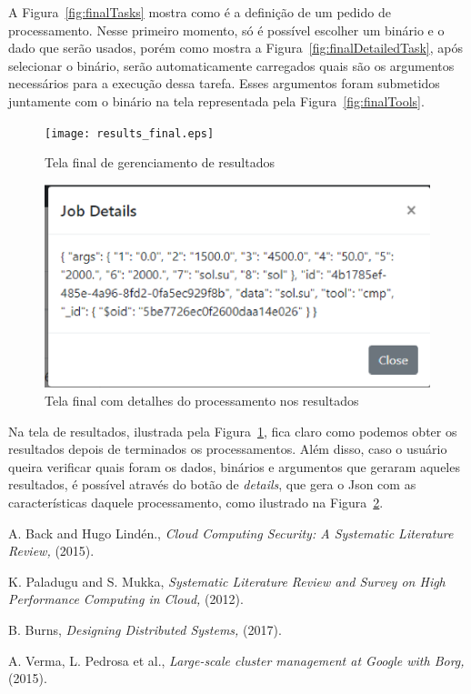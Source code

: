 \documentclass[11pt,twoside]{article}
\begin{document}
A Figura~\ref{fig:finalTasks} mostra como é a definição de um pedido de processamento. Nesse primeiro momento, só é possível escolher um binário e o dado que serão usados, porém como mostra 
a Figura~\ref{fig:finalDetailedTask}, após selecionar o binário, serão automaticamente carregados quais são os argumentos necessários para a execução dessa tarefa. Esses argumentos
foram submetidos juntamente com o binário na tela representada pela Figura~\ref{fig:finalTools}.

\begin{figure}[!h]
  \centering
  \texttt{[image: results\_final.eps]}
  \caption{Tela final de gerenciamento de resultados}
  \label{fig:finalResults}
\end{figure}

\begin{figure}[!h]
  \centering
  \includegraphics[scale=0.6]{results_detail_final.eps}
  \caption{Tela final com detalhes do processamento nos resultados}
  \label{fig:finalResultsDetail}
\end{figure}

Na tela de resultados, ilustrada pela Figura~\ref{fig:finalResults}, fica claro como podemos obter os resultados depois de terminados os processamentos. Além disso, caso o usuário queira verificar 
quais foram os dados, binários e argumentos que geraram aqueles resultados, é possível através do botão de \emph{details}, que gera o Json com as características daquele processamento, como ilustrado na 
Figura~\ref{fig:finalResultsDetail}.

\begin{thebibliography}{99}

 A. Back and Hugo Lindén., {\it Cloud Computing Security: A Systematic Literature Review,} (2015).

 K. Paladugu and S. Mukka, {\it Systematic Literature Review and Survey on High Performance Computing in Cloud,} (2012).

 B. Burns, {\it Designing Distributed Systems,} (2017).

 A. Verma, L. Pedrosa  et al., {\it Large-scale cluster management at Google with Borg,} (2015).

\end{thebibliography}
\end{document}
